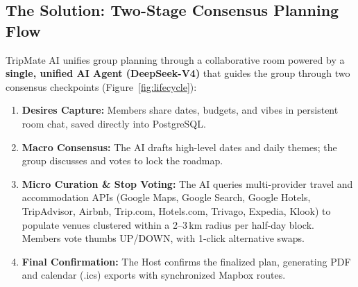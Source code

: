 \documentclass[11pt,a4paper]{article}
\begin{document}
\subsection{The Solution: Two-Stage Consensus Planning Flow}
TripMate AI unifies group planning through a collaborative room powered by a \textbf{single, unified AI Agent (DeepSeek-V4)} that guides the group through two consensus checkpoints (Figure~\ref{fig:lifecycle}):
\begin{enumerate}
\item \textbf{Desires Capture:} Members share dates, budgets, and vibes in persistent room chat, saved directly into PostgreSQL.
\item \textbf{Macro Consensus:} The AI drafts high-level dates and daily themes; the group discusses and votes to lock the roadmap.
\item \textbf{Micro Curation \& Stop Voting:} The AI queries multi-provider travel and accommodation APIs (Google Maps, Google Search, Google Hotels, TripAdvisor, Airbnb, Trip.com, Hotels.com, Trivago, Expedia, Klook) to populate venues clustered within a 2--3\,km radius per half-day block. Members vote thumbs UP/DOWN, with 1-click alternative swaps.
\item \textbf{Final Confirmation:} The Host confirms the finalized plan, generating PDF and calendar (.ics) exports with synchronized Mapbox routes.
\end{enumerate}
\end{document}
